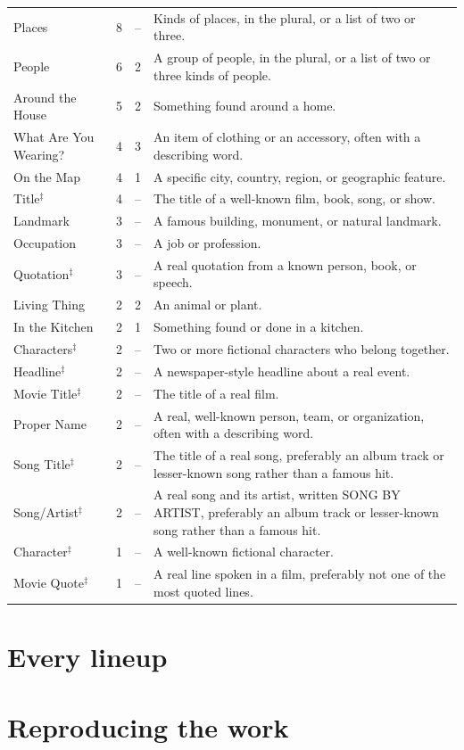 \begin{longtable}{lrrp{}}
Places & 8 & -- & Kinds of places, in the plural, or a list of two or three. \\
People & 6 & 2 & A group of people, in the plural, or a list of two or three kinds of people. \\
Around the House & 5 & 2 & Something found around a home. \\
What Are You Wearing? & 4 & 3 & An item of clothing or an accessory, often with a describing word. \\
On the Map & 4 & 1 & A specific city, country, region, or geographic feature. \\
Title$^\ddagger$ & 4 & -- & The title of a well-known film, book, song, or show. \\
Landmark & 3 & -- & A famous building, monument, or natural landmark. \\
Occupation & 3 & -- & A job or profession. \\
Quotation$^\ddagger$ & 3 & -- & A real quotation from a known person, book, or speech. \\
Living Thing & 2 & 2 & An animal or plant. \\
In the Kitchen & 2 & 1 & Something found or done in a kitchen. \\
Characters$^\ddagger$ & 2 & -- & Two or more fictional characters who belong together. \\
Headline$^\ddagger$ & 2 & -- & A newspaper-style headline about a real event. \\
Movie Title$^\ddagger$ & 2 & -- & The title of a real film. \\
Proper Name & 2 & -- & A real, well-known person, team, or organization, often with a describing word. \\
Song Title$^\ddagger$ & 2 & -- & The title of a real song, preferably an album track or lesser-known song rather than a famous hit. \\
Song/Artist$^\ddagger$ & 2 & -- & A real song and its artist, written SONG BY ARTIST, preferably an album track or lesser-known song rather than a famous hit. \\
Character$^\ddagger$ & 1 & -- & A well-known fictional character. \\
Movie Quote$^\ddagger$ & 1 & -- & A real line spoken in a film, preferably not one of the most quoted lines. \\
\bottomrule
\end{longtable}
\normalsize

\section{Every lineup}\label{app:lineups}

\section{Reproducing the work}\label{app:repro}
